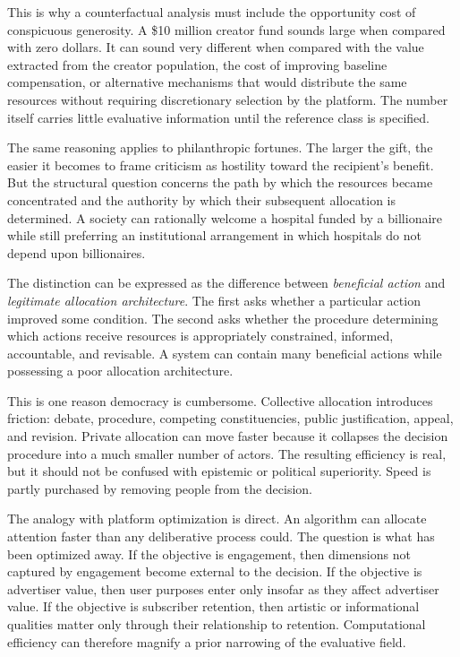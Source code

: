 \documentclass[11pt]{article}
\begin{document}
This is why a counterfactual analysis must include the opportunity cost of conspicuous generosity. A \$10 million creator fund sounds large when compared with zero dollars. It can sound very different when compared with the value extracted from the creator population, the cost of improving baseline compensation, or alternative mechanisms that would distribute the same resources without requiring discretionary selection by the platform. The number itself carries little evaluative information until the reference class is specified.

The same reasoning applies to philanthropic fortunes. The larger the gift, the easier it becomes to frame criticism as hostility toward the recipient's benefit. But the structural question concerns the path by which the resources became concentrated and the authority by which their subsequent allocation is determined. A society can rationally welcome a hospital funded by a billionaire while still preferring an institutional arrangement in which hospitals do not depend upon billionaires.

The distinction can be expressed as the difference between \emph{beneficial action} and \emph{legitimate allocation architecture}. The first asks whether a particular action improved some condition. The second asks whether the procedure determining which actions receive resources is appropriately constrained, informed, accountable, and revisable. A system can contain many beneficial actions while possessing a poor allocation architecture.

This is one reason democracy is cumbersome. Collective allocation introduces friction: debate, procedure, competing constituencies, public justification, appeal, and revision. Private allocation can move faster because it collapses the decision procedure into a much smaller number of actors. The resulting efficiency is real, but it should not be confused with epistemic or political superiority. Speed is partly purchased by removing people from the decision.

The analogy with platform optimization is direct. An algorithm can allocate attention faster than any deliberative process could. The question is what has been optimized away. If the objective is engagement, then dimensions not captured by engagement become external to the decision. If the objective is advertiser value, then user purposes enter only insofar as they affect advertiser value. If the objective is subscriber retention, then artistic or informational qualities matter only through their relationship to retention. Computational efficiency can therefore magnify a prior narrowing of the evaluative field.
\end{document}
